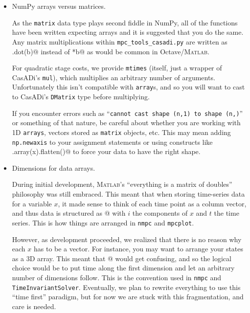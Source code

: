 \documentclass{article}
\newcommand{\casadi}{CasADi}
\begin{document}
\begin{itemize}
    \item NumPy arrays versus matrices.
    
    As the \texttt{matrix} data type plays second fiddle in NumPy, all of the functions have been written expecting arrays and it is suggested that you do the same.
    Any matrix multiplications within \texttt{mpc\_tools\_casadi.py} are written as \lstinline@A.dot(b)@ instead of \lstinline@A*b@ as would be common in Octave/\textsc{Matlab}.
    
    For quadratic stage costs, we provide \texttt{mtimes} (itself, just a wrapper of \casadi{}'s \texttt{mul}), which multiplies an arbitrary number of arguments.
    Unfortunately this isn't compatible with \texttt{array}s, and so you will want to cast to \casadi{}'s \texttt{DMatrix} type before multiplying.
    
    If you encounter errors such as ``\texttt{cannot cast shape (n,1) to shape (n,)}'' or something of that nature, be careful about whether you are working with 1D \texttt{arrays}, vectors stored as \texttt{matrix} objects, etc.
    This may mean adding \texttt{np.newaxis} to your assignment statements or using constructs like \lstinline@np.array(x).flatten()@ to force your data to have the right shape.
    
    \item Dimensions for data arrays.
    
    During initial development, \textsc{Matlab}'s ``everything is a matrix of doubles'' philosophy was still embraced.
    This meant that when storing time-series data for a variable $x$, it made sense to think of each time point as a column vector, and thus data is structured as \lstinline@x[i,t]@ with $i$ the components of $x$ and $t$ the time series.
    This is how things are arranged in \texttt{nmpc} and \texttt{mpcplot}.
    
    However, as development proceeded, we realized that there is no reason why each $x$ has to be a vector.
    For instance, you may want to arrange your states as a 3D array.
    This meant that \lstinline@x[i_1,t,i_2,i_3]@ would get confusing, and so the logical choice would be to put time along the first dimension and let an arbitrary number of dimensions follow.
    This is the convention used in \texttt{nmpc} and \texttt{TimeInvariantSolver}.
    Eventually, we plan to rewrite everything to use this ``time first'' paradigm, but for now we are stuck with this fragmentation, and care is needed.
    

\end{itemize}
\end{document}
